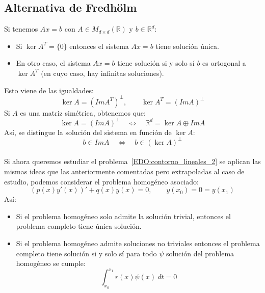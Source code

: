 \subsection{Alternativa de Fredhölm}
Si tenemos $Ax=b$ con $A\in M_{d\times d}(\mathbb{R})$ y $b\in \mathbb{R}^d$:
\begin{itemize}
    \item Si $\ker A^T = \{0\}$ entonces el sistema $Ax = b$ tiene solución única.
    \item En otro caso, el sistema $Ax = b$ tiene solución si y solo sí $b$ es ortogonal a $\ker A^T$ (en cuyo caso, hay infinitas soluciones).
\end{itemize}
Esto viene de las igualdades:
\begin{equation*}
    \ker A = (Im A^T)^\perp, \qquad \ker A^T = (Im A)^\perp
\end{equation*}
Si $A$ es una matriz simétrica, obtenemos que:
\begin{equation*}
    \ker A = (Im A)^\perp \quad\Longleftrightarrow\quad \mathbb{R}^d = \ker A \oplus Im A
\end{equation*}
Así, se distingue la solución del sistema en función de $\ker A$:
\begin{equation*}
    b\in Im A \quad\Longleftrightarrow\quad b \in (\ker A)^\perp
\end{equation*}~\\

\noindent
Si ahora queremos estudiar el problema~\eqref{EDO:contorno_lineales_2} se aplican las mismas ideas que las anteriormente comentadas pero extrapoladas al caso de estudio, podemos considerar el problema homogéneo asociado:
\begin{equation*}
    (p(x)y'(x))' + q(x)y(x) = 0, \qquad y(x_0) = 0 = y(x_1)
\end{equation*}
Así:
\begin{itemize}
    \item Si el problema homogéneo solo admite la solución trivial, entonces el problema completo tiene única solución.
    \item Si el problema homogéneo admite soluciones no triviales entonces el problema completo tiene solución si y solo sí para todo $\psi$ solución del problema homogéneo se cumple:
        \begin{equation*}
            \int_{x_0}^{x_1} r(x)\psi(x) ~dt  = 0
        \end{equation*}
\end{itemize}~\\


